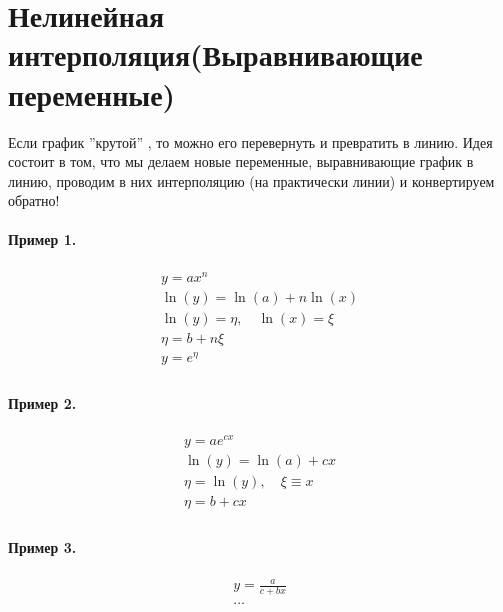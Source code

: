 \section{Нелинейная интерполяция\newline (Выравнивающие переменные)}
Если график ''крутой'' , то можно его перевернуть и превратить в линию. Идея состоит в том,
что мы делаем новые переменные, выравнивающие график в линию, проводим в них интерполяцию
(на практически линии) и конвертируем обратно!
\paragraph*{Пример 1.}
\begin{gather*}
    y=ax^{n}\\
    \ln(y) = \ln(a) + n\ln(x)\\
    \ln(y) = \eta, \quad \ln(x) = \xi\\
    \eta = b + n\xi\\
    y = e^{\eta}\\
\end{gather*}

\paragraph*{Пример 2.}
\begin{gather*}
    y = ae^{cx}\\
    \ln(y) = \ln(a) + cx\\
    \eta = \ln(y), \quad \xi \equiv x\\
    \eta = b + cx\\
\end{gather*}

\paragraph*{Пример 3.}
\begin{gather*}
    y = \frac{a}{c + bx}\\
    \ldots \\
\end{gather*}

